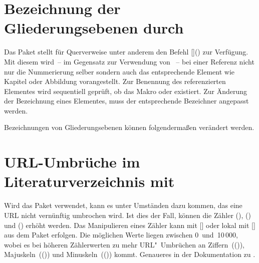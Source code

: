 \section{%
  Bezeichnung der Gliederungsebenen durch %
}
%
%
Das Paket  stellt für Querverweise unter anderem den Befehl 
[]() zur Verfügung. Mit 
diesem wird~-- im Gegensatz zur Verwendung von ~-- bei einer 
Referenz nicht nur die Nummerierung selber sondern auch das entsprechende 
Element wie Kapitel oder Abbildung vorangestellt. Zur Benennung des 
referenzierten Elementes wird sequentiell geprüft, ob das Makro 
 oder  
existiert. Zur Änderung der Bezeichnung eines Elementes, muss der entsprechende 
Bezeichner angepasst werden.
%
\begin{Example}
Bezeichnungen von Gliederungsebenen können folgendermaßen verändert werden.
\begin{Code}
\end{Code}
\end{Example}



\section{%
  URL-Umbrüche im Literaturverzeichnis mit %
}
%
%
Wird das Paket  verwendet, kann es unter Umständen dazu 
kommen, das eine URL nicht vernünftig umbrochen wird. Ist dies der Fall, 
können die Zähler (), 
() und 
() erhöht werden. Das Manipulieren 
eines Zähler kann mit [] oder lokal mit 
[] aus dem Paket  
erfolgen. Die möglichen Werte liegen zwischen 0~und~10\,000, wobei es bei 
höheren Zählerwerten zu mehr URL"~Umbrüchen an 
Ziffern~(()), 
Majuskeln~(()) und 
Minuskeln~(()) kommt. 
Genaueres in der Dokumentation zu .



